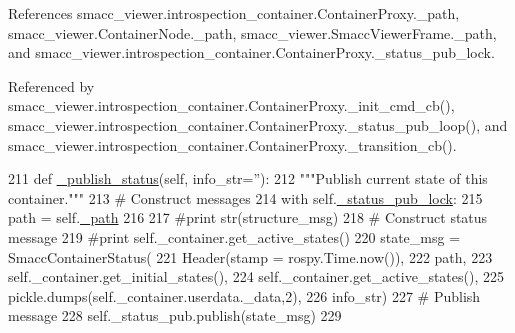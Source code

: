 References smacc\+\_\+viewer.\+introspection\+\_\+container.\+Container\+Proxy.\+\_\+path, smacc\+\_\+viewer.\+Container\+Node.\+\_\+path, smacc\+\_\+viewer.\+Smacc\+Viewer\+Frame.\+\_\+path, and smacc\+\_\+viewer.\+introspection\+\_\+container.\+Container\+Proxy.\+\_\+status\+\_\+pub\+\_\+lock.



Referenced by smacc\+\_\+viewer.\+introspection\+\_\+container.\+Container\+Proxy.\+\_\+init\+\_\+cmd\+\_\+cb(), smacc\+\_\+viewer.\+introspection\+\_\+container.\+Container\+Proxy.\+\_\+status\+\_\+pub\+\_\+loop(), and smacc\+\_\+viewer.\+introspection\+\_\+container.\+Container\+Proxy.\+\_\+transition\+\_\+cb().


\begin{DoxyCode}
211     \textcolor{keyword}{def }\hyperlink{classsmacc__viewer_1_1introspection__container_1_1ContainerProxy_ad4a053afedd3cc6cdc2e30b6db418e7e}{\_publish\_status}(self, info\_str=''):
212         \textcolor{stringliteral}{"""Publish current state of this container."""}
213         \textcolor{comment}{# Construct messages}
214         with self.\hyperlink{classsmacc__viewer_1_1introspection__container_1_1ContainerProxy_a666abcc33df4a2601f414eb66867a634}{\_status\_pub\_lock}:
215             path = self.\hyperlink{classsmacc__viewer_1_1introspection__container_1_1ContainerProxy_a1196c9f62c5bf656de0dddba97f57884}{\_path}
216             
217             \textcolor{comment}{#print str(structure\_msg)}
218             \textcolor{comment}{# Construct status message}
219             \textcolor{comment}{#print self.\_container.get\_active\_states()}
220             state\_msg = SmaccContainerStatus(
221                     Header(stamp = rospy.Time.now()),
222                     path,
223                     self.\_container.get\_initial\_states(),
224                     self.\_container.get\_active\_states(),
225                     pickle.dumps(self.\_container.userdata.\_data,2),
226                     info\_str)
227             \textcolor{comment}{# Publish message}
228             self.\_status\_pub.publish(state\_msg)
229 
\end{DoxyCode}



